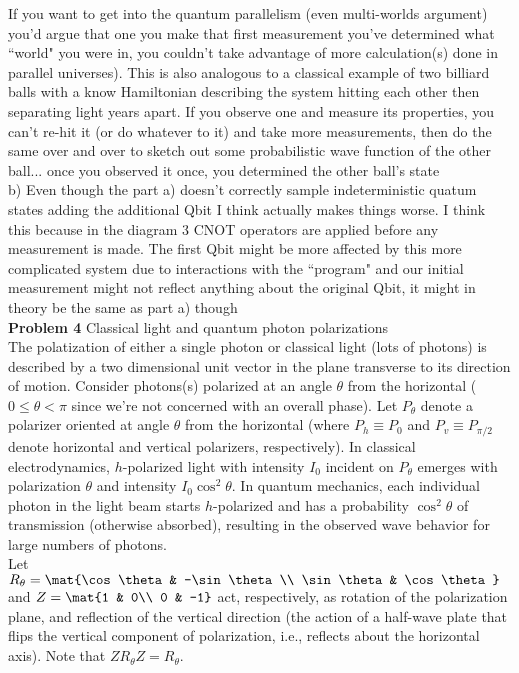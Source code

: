 If you want to get into the quantum parallelism (even multi-worlds argument)
you'd argue that one you make that first measurement you've determined what
``world" you were in, you couldn't take advantage of more calculation(s) done
in parallel universes). This is also analogous to a classical example of two
billiard balls with a know Hamiltonian describing the system hitting each
other then separating light years apart. If you observe one and measure its
properties, you can't re-hit it (or do whatever to it) and take more
measurements, then do the same over and over to sketch out some probabilistic  wave function of the other
ball... once you observed it once, you determined the other ball's state\\

b) Even though the part a) doesn't correctly sample indeterministic quatum
states adding the additional Qbit I think actually makes things worse. I think
this because in the diagram 3 CNOT operators are applied before any
measurement is made. The first Qbit might be more affected by this more
complicated system due to interactions with the ``program" and our initial
measurement might not reflect anything about the original Qbit, it might in
theory be the same as part a) though\\

\textbf{Problem 4} Classical light and quantum photon polarizations\\
The polatization of either a single photon or classical light (lots of
photons) is described by a two dimensional unit vector in the plane transverse
to its direction of motion. Consider photons(s) polarized at an angle $\theta$
from the horizontal ($0\leq\theta<\pi$ since we're not concerned with an
overall phase). Let $P_\theta$ denote a polarizer oriented at angle $\theta$
from the horizontal (where $P_h\equiv P_0$ and $P_v\equiv P_{\pi/2}$ denote
horizontal and vertical polarizers, respectively). In classical
electrodynamics, $h$-polarized light with intensity $I_0$ incident on
$P_\theta$ emerges with polarization $\theta$ and intensity $I_0\cos
^2\theta$. In quantum mechanics, each individual photon in the light beam
starts $h$-polarized and has a probability $\cos^2\theta$ of transmission
(otherwise absorbed), resulting in the observed wave behavior for large
numbers of photons.\\

Let $R_\theta=\mat{\cos\theta & -\sin\theta \\ \sin\theta & \cos\theta}$ and
$Z=\mat{1 & 0\\ 0 & -1}$ act, respectively, as rotation of the polarization
plane, and reflection of the vertical direction (the action of a half-wave
plate that flips the vertical component of polarization, i.e., reflects about
the horizontal axis). Note that $ZR_\theta Z=R_\theta$.\\

